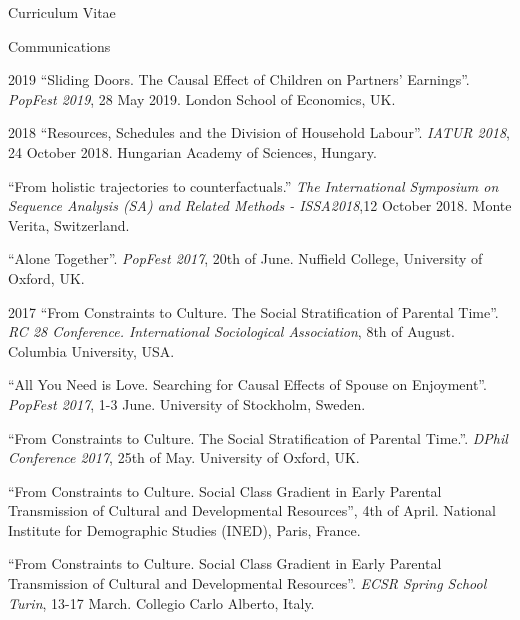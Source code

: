 \documentclass[12pt,a4paper]{article}
\begin{document}
\begin{cv}{Curriculum Vitae}
\begin{cvlist}{Communications}

    \item[2019] ``Sliding Doors. The Causal Effect of Children on Partners' Earnings''. \emph{PopFest 2019}, 28 May 2019. London School of Economics, UK. 

    \item[2018] ``Resources, Schedules and the Division of Household Labour''. \emph{IATUR 2018}, 24 October 2018. Hungarian Academy of Sciences, Hungary.

    \item[] ``From holistic trajectories to counterfactuals.'' \emph{The International Symposium on Sequence Analysis (SA) and Related Methods - ISSA2018},12 October 2018. Monte Verita, Switzerland.

		\item[] ``Alone Together''. \emph{PopFest 2017}, 20th of June. Nuffield College, University of Oxford, UK. 
			
		\item[2017] ``From Constraints to Culture. The Social Stratification of Parental Time''. \emph{RC 28 Conference. International Sociological Association}, 8th of August. Columbia University, USA. 
				
	\item[] ``All You Need is Love. Searching for Causal Effects of Spouse on Enjoyment''. \emph{PopFest 2017}, 1-3 June. University of Stockholm, Sweden. 
	
	\item[] ``From Constraints to Culture.
The Social Stratification of Parental Time.''. \emph{DPhil Conference 2017}, 25th of May. University of Oxford, UK. 
	
	\item[]  ``From Constraints to Culture. Social Class Gradient in Early Parental Transmission of Cultural and Developmental Resources'', 4th of April. National Institute for Demographic Studies (INED), Paris, France. 
	
	\item[]  ``From Constraints to Culture. Social Class Gradient in Early Parental Transmission of Cultural and Developmental Resources''. \emph{ECSR Spring School Turin}, 13-17 March. Collegio Carlo Alberto, Italy. 
	

\end{cvlist}
\end{cv}
\end{document}
